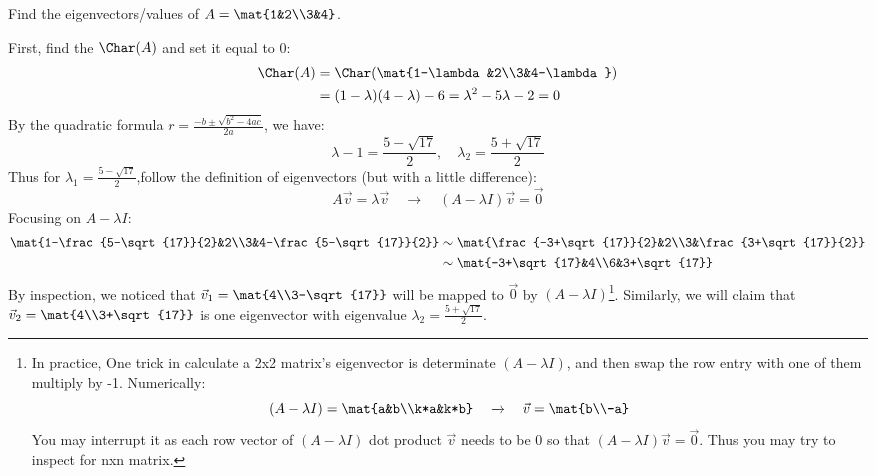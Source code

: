 \begin{example}
	Find the eigenvectors/values of $A=\mat{1&2\\3&4}$.

	First, find the $\Char(A)$ and set it equal to 0:
	\begin{align*}
	    \Char(A)&=\Char(\mat{1-\lambda&2\\3&4-\lambda})\\
	            &=(1-\lambda)(4-\lambda)-6=\lambda^2-5\lambda-2=0
	\end{align*}
	By the quadratic formula $r=\frac{-b\pm\sqrt{b^2-4ac}}{2a}$, we have:
	$$\lambda-1=\frac{5-\sqrt{17}}{2},\quad\lambda_2=\frac{5+\sqrt{17}}{2}$$
	Thus for $\lambda_1=\frac{5-\sqrt{17}}{2}$,follow the definition of eigenvectors (but with a little difference):
	$$A\vec v=\lambda\vec v \quad\xrightarrow{}\quad(A-\lambda I)\vec v=\vec 0$$
	Focusing on $A - \lambda I$:
	\begin{align*}
	    \mat{1-\frac{5-\sqrt{17}}{2}&2\\3&4-\frac{5-\sqrt{17}}{2}} & \sim
	    \mat{\frac{-3+\sqrt{17}}{2}&2\\3&\frac{3+\sqrt{17}}{2}}\\
	    & \sim \mat{-3+\sqrt{17}&4\\6&3+\sqrt{17}}
	\end{align*}
	By inspection, we noticed that $\vec v_1 = \mat{4\\3-\sqrt{17}}$ will be mapped to $\vec 0$ by $(A-\lambda I)$\footnote{In practice, One trick in calculate a 2x2 matrix's eigenvector is determinate $(A-\lambda I)$, and then swap the row entry with one of them multiply by -1. Numerically: 
	$$(A-\lambda I) = \mat{a&b\\k*a&k*b}\quad\xrightarrow{}\quad\vec v=\mat{b\\-a}$$
	You may interrupt it as each row vector of $(A-\lambda I)$ dot product $\vec v$ needs to be 0 so that $(A-\lambda I) \vec v=\vec 0$. Thus you may try to inspect for nxn matrix.}. Similarly, we will claim that $\vec v_2=\mat{4\\3+\sqrt{17}}$ is one eigenvector with eigenvalue $\lambda_2 = \frac{5+\sqrt{17}}{2}$.
\end{example}

